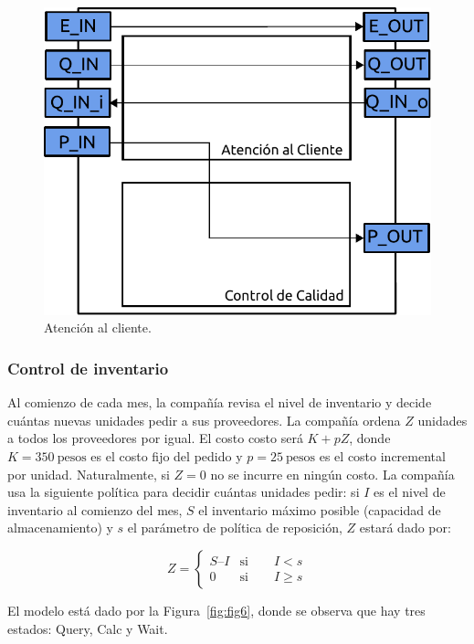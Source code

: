 \documentclass[10pt]{article}
\begin{document}
\begin{figure}
\centering
\includegraphics[scale=0.8]{img/figura5}
\caption{Atención al cliente.}
\label{fig:fig5}
\end{figure}

\subsubsection{Control de inventario\label{sec:CID}}

Al comienzo de cada mes, la compañía revisa el nivel de inventario y decide cuántas nuevas unidades pedir a sus proveedores. La compañía ordena $Z$ unidades a todos los proveedores por igual. El costo costo será $K + pZ$, donde $K = 350~\textrm{pesos}$ es el costo fijo del pedido y $p = 25~\textrm{pesos}$ es el costo incremental por unidad. Naturalmente, si $Z = 0$ no se incurre en ningún costo. La compañía usa la siguiente política para decidir cuántas unidades pedir: si $I$ es el nivel de inventario al comienzo del mes, $S$ el inventario máximo posible (capacidad de almacenamiento) y $s$ el parámetro de política de reposición, $Z$ estará dado por:

\begin{equation}
Z=\left\{\begin{array}{lr}
		S – I & \textrm{si}\qquad I < s\\
		0 & \textrm{si} \qquad I \geq s
	\end{array}\right.
\label{eq:ctrlinv}
\end{equation}

El modelo está dado por la Figura~\ref{fig:fig6}, donde se observa que hay tres estados: Query, Calc y Wait.
\end{document}
